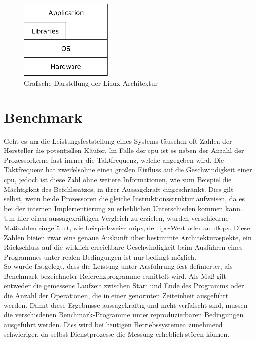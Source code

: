 \begin{itemize}
  \begin{figure}[H]
  \centering
  \includegraphics[width=0.4\textwidth]{Hauptteil/linuxmode.eps}
  \caption{Grafische Darstellung der Linux-Architektur}\label{fig:linuxmode}
  \end{figure}
\end{itemize}






\section{Benchmark}\label{kap:benchmark}
Geht es um die Leistungsfeststellung eines Systems täuschen oft Zahlen der Hersteller die potentiellen Käufer. Im Falle der \ac{cpu} ist es neben der Anzahl der Prozessorkerne
 fast immer die Taktfrequenz, welche angegeben wird.
Die Taktfrequenz hat zweifelsohne einen großen Einfluss auf die Geschwindigkeit einer \ac{cpu}, jedoch ist diese Zahl ohne weitere Informationen, wie zum Beispiel die
Mächtigkeit des Befehlssatzes, in ihrer Aussagekraft eingeschränkt. Dies gilt selbst, wenn beide Prozessoren die gleiche Instruktionsstruktur aufweisen, da es bei der
internen Implementierung zu erheblichen Unterschieden kommen kann. \\
Um hier einen aussagekräftigen Vergleich zu erzielen, wurden verschiedene Maßzahlen eingeführt, wie beispielsweise \ac{mips}, der \ac{ipc}-Wert oder ac{mflops}. Diese
 Zahlen bieten zwar eine genaue Auskunft über bestimmte Architekturaspekte, ein Rückschluss auf die wirklich erreichbare Geschwindigkeit beim Ausführen eines Programmes
 unter realen Bedingungen ist nur bedingt möglich. \\
So wurde festgelegt, dass die Leistung unter Ausführung fest definierter, als Benchmark bezeichneter Referenzprogramme ermittelt wird. Als Maß gilt entweder die gemessene
 Laufzeit zwischen Start und Ende des Programms oder die Anzahl der Operationen, die in einer genormten Zeiteinheit ausgeführt werden. Damit diese Ergebnisse aussagekräftig
 und nicht verfälscht sind, müssen die verschiedenen Benchmark-Programme unter reproduzierbaren Bedingungen ausgeführt werden. Dies wird bei heutigen Betriebssystemen zunehmend
  schwieriger, da selbst Dienstprozesse die Messung erheblich stören können.~\cite{benchmark}

